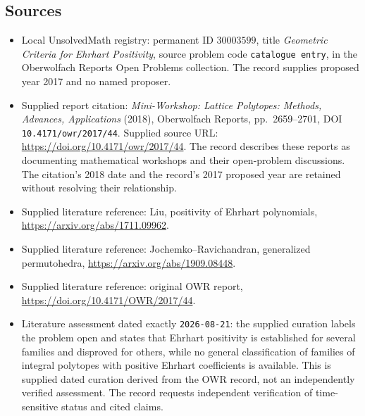 \documentclass[11pt]{article}
\begin{document}
\subsection{Sources}
\begin{itemize}
\item Local UnsolvedMath registry: permanent ID \(30003599\), title \emph{Geometric Criteria for Ehrhart Positivity}, source problem code \texttt{catalogue entry}, in the Oberwolfach Reports Open Problems collection. The record supplies proposed year 2017 and no named proposer.
\item Supplied report citation: \emph{Mini-Workshop: Lattice Polytopes: Methods, Advances, Applications} (2018), Oberwolfach Reports, pp.\ 2659--2701, DOI \texttt{10.4171/owr/2017/44}. Supplied source URL: \url{https://doi.org/10.4171/owr/2017/44}. The record describes these reports as documenting mathematical workshops and their open-problem discussions. The citation's 2018 date and the record's 2017 proposed year are retained without resolving their relationship.
\item Supplied literature reference: Liu, positivity of Ehrhart polynomials, \url{https://arxiv.org/abs/1711.09962}.
\item Supplied literature reference: Jochemko--Ravichandran, generalized permutohedra, \url{https://arxiv.org/abs/1909.08448}.
\item Supplied literature reference: original OWR report, \url{https://doi.org/10.4171/OWR/2017/44}.
\item Literature assessment dated exactly \texttt{2026-08-21}: the supplied curation labels the problem open and states that Ehrhart positivity is established for several families and disproved for others, while no general classification of families of integral polytopes with positive Ehrhart coefficients is available. This is supplied dated curation derived from the OWR record, not an independently verified assessment. The record requests independent verification of time-sensitive status and cited claims.
\end{itemize}
\end{document}
